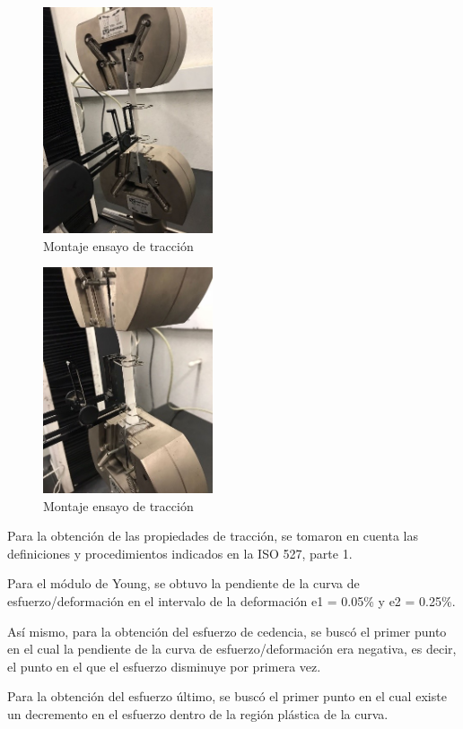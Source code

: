 \documentclass[journal,transmag]{IEEEtran}
\begin{document}
    	\begin{figure}[!h]
		\center
		\includegraphics[width=5cm]{imagenes/ensayo1.png}
		\caption{ Montaje ensayo de tracción    }
		\label{31}
	\end{figure}
	
	\begin{figure}[!h]
		\center
		\includegraphics[width=5cm]{imagenes/ensayo2.png}
		\caption{ Montaje ensayo de tracción   }
		\label{32}
	\end{figure}
 
Para la obtención de las propiedades de tracción, se tomaron en cuenta las definiciones y procedimientos indicados en la ISO 527, parte 1. 

Para el módulo de Young, se obtuvo la pendiente de la curva de esfuerzo/deformación en el intervalo de la deformación e1 = 0.05\% y e2 = 0.25\%. 

Así mismo, para la obtención del esfuerzo de cedencia, se buscó el primer punto en el cual la pendiente de la curva de esfuerzo/deformación era negativa, es decir, el punto en el que el esfuerzo disminuye por primera vez. 

Para la obtención del esfuerzo último, se buscó el primer punto en el cual existe un decremento en el esfuerzo dentro de la región plástica de la curva. 
\end{document}
